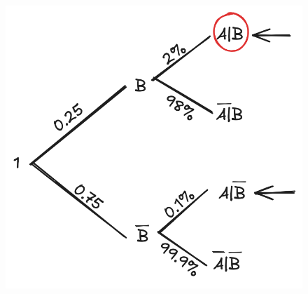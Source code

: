 \documentclass[twoside,final]{hcmut-report}
\begin{document}
\begin{minipage}{0.4\textwidth}
    \begin{figure}[H]
        \includegraphics[width=\textwidth]{images/Nghệ An 2025 - Đợt 3/NgheAn25-1.png}
    \end{figure}
\end{minipage}
\end{document}
